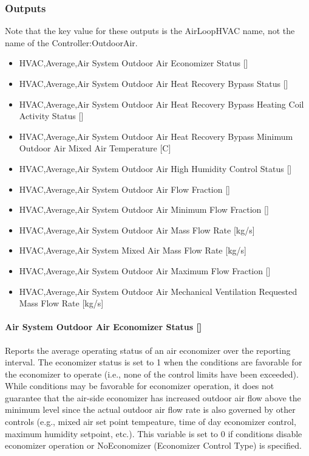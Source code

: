 \subsubsection{Outputs}\label{outputs-005}

Note that the key value for these outputs is the AirLoopHVAC name, not the name of the Controller:OutdoorAir.

\begin{itemize}
\item
  HVAC,Average,Air System Outdoor Air Economizer Status {[]}
\item
  HVAC,Average,Air System Outdoor Air Heat Recovery Bypass Status {[]}
\item
  HVAC,Average,Air System Outdoor Air Heat Recovery Bypass Heating Coil Activity Status {[]}
\item
  HVAC,Average,Air System Outdoor Air Heat Recovery Bypass Minimum Outdoor Air Mixed Air Temperature {[}C{]}
\item
  HVAC,Average,Air System Outdoor Air High Humidity Control Status {[]}
\item
  HVAC,Average,Air System Outdoor Air Flow Fraction {[]}
\item
  HVAC,Average,Air System Outdoor Air Minimum Flow Fraction {[]}
\item
  HVAC,Average,Air System Outdoor Air Mass Flow Rate {[}kg/s{]}
\item
  HVAC,Average,Air System Mixed Air Mass Flow Rate {[}kg/s{]}
\item
  HVAC,Average,Air System Outdoor Air Maximum Flow Fraction {[]}
\item
  HVAC,Average,Air System Outdoor Air Mechanical Ventilation Requested Mass Flow Rate {[}kg/s{]}
\end{itemize}

\paragraph{Air System Outdoor Air Economizer Status {[]}}\label{air-system-outdoor-air-economizer-status}

Reports the average operating status of an air economizer over the reporting interval. The economizer status is set to 1 when the conditions are favorable for the economizer to operate (i.e., none of the control limits have been exceeded). While conditions may be favorable for economizer operation, it does not guarantee that the air-side economizer has increased outdoor air flow above the minimum level since the actual outdoor air flow rate is also governed by other controls (e.g., mixed air set point tempeature, time of day economizer control, maximum humidity setpoint, etc.). This variable is set to 0 if conditions disable economizer operation or NoEconomizer (Economizer Control Type) is specified.

